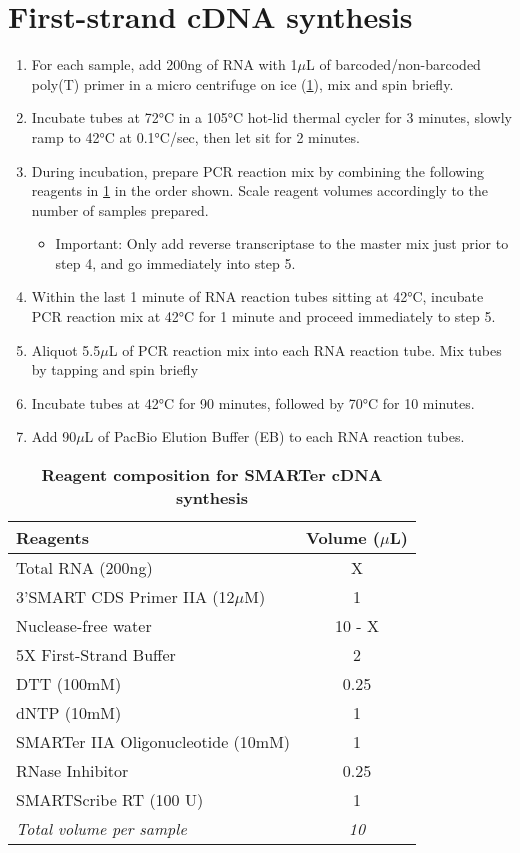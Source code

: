 \section{First-strand cDNA synthesis}
\label{Isoseq_protocol_cDNAsynthesis}
\begin{enumerate}
	\item For each sample, add 200ng of RNA with 1$\mu$L of barcoded/non-barcoded poly(T) primer in a micro centrifuge on ice (\cref{tab:cdna_synthesis}), mix and spin briefly.
	\item Incubate tubes at 72°C in a 105°C hot-lid thermal cycler for 3 minutes, slowly ramp to 42°C at 0.1°C/sec, then let sit for 2 minutes.
	\item During incubation, prepare PCR reaction mix by combining the following reagents in \cref{tab:cdna_synthesis} in the order shown. Scale reagent volumes accordingly to the number of samples prepared.
	\begin{itemize}
		\item Important: Only add reverse transcriptase to the master mix just prior to step 4, and go immediately into step 5.
	\end{itemize}
	\item Within the last 1 minute of RNA reaction tubes sitting at 42°C, incubate PCR reaction mix at 42°C for 1 minute and proceed immediately to step 5.
	\item Aliquot 5.5$\mu$L of PCR reaction mix into each RNA reaction tube. Mix tubes by tapping and spin briefly 
	\item Incubate tubes at 42°C for 90 minutes, followed by 70°C for 10 minutes. 
	\item Add 90$\mu$L of PacBio Elution Buffer (EB) to each RNA reaction tubes.
\end{enumerate}

\vspace{1cm}
\begin{table}[h]
	\centering
	\caption[Reagent composition for SMARTer cDNA synthesis]%
	{\textbf{Reagent composition for SMARTer cDNA synthesis}}
	\label{tab:cdna_synthesis}
	\begin{tabularx}{0.8\textwidth}{lc}
		\toprule 
		Reagents                         & Volume ($\mu$L) \\ \midrule
		Total RNA (200ng)         		 & X          \\ 
		3'SMART CDS Primer IIA (12$\mu$M)   & 1           \\ 
		Nuclease-free water              & 10 - X          \\ 
		5X First-Strand Buffer			 & 2       \\ 
		DTT (100mM)						 & 0.25       \\ 
		dNTP (10mM)						 & 1       \\ 
		SMARTer IIA Oligonucleotide (10mM) & 1       \\ 
		RNase Inhibitor					 & 0.25       \\ 
		SMARTScribe RT (100 U)	      	 & 1       \\ 
		\textit{Total volume per sample}          & \textit{10}          \\ 
		\bottomrule	
	\end{tabularx}
\end{table}

